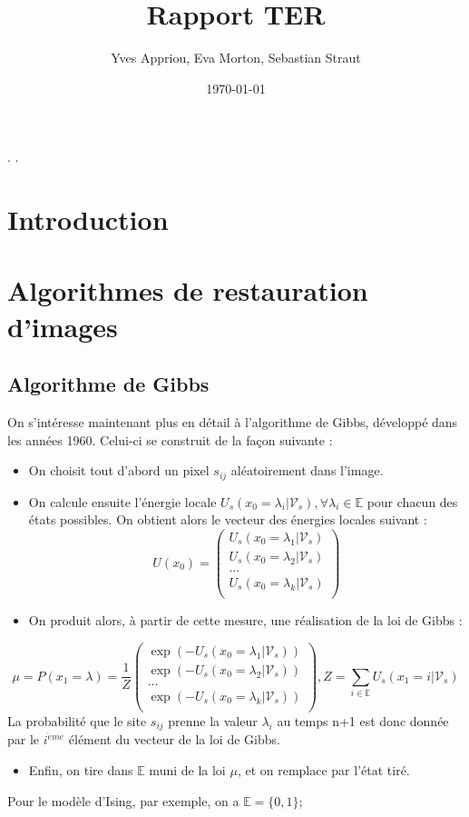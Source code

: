 \documentclass[a4paper, 12pt]{article}
\title{Rapport TER}
\author{Yves Appriou, Eva Morton, Sebastian Straut}
\date{\today}
\begin{document}
\maketitle

\tableofcontents.
\newpage.
\section{Introduction}
\section{Algorithmes de restauration d'images}
\subsection[Algorithme de Gibbs]{Algorithme de Gibbs}
On s'intéresse maintenant plus en détail à l'algorithme de Gibbs, développé dans les années 1960. Celui-ci se construit de la façon suivante : 
\begin{itemize}
\item On choisit tout d'abord un pixel $s_{ij} $ aléatoirement dans l'image.
\item On calcule ensuite l'énergie locale $U_s(x_0=\lambda_i| \mathcal{V}_s), \forall \lambda_i \in \mathbb{E}  $ pour chacun des états possibles. On obtient alors le vecteur des énergies locales suivant : 
\[
  U(x_0) = \left(
          \begin{array}{ll}
            U_s(x_0=\lambda_1| \mathcal{V}_s) \\
            U_s(x_0=\lambda_2| \mathcal{V}_s) \\
            ...\\
            U_s(x_0=\lambda_k| \mathcal{V}_s) \\
          \end{array}
        \right)
\]
\item On produit alors, à partir de cette mesure, une réalisation de la loi de Gibbs : 
\end{itemize}
\[
  \mu = P(x_1 = \lambda) = \frac{1}{Z} \left(
          \begin{array}{ll}
            \exp(-U_s(x_0=\lambda_1| \mathcal{V}_s)) \\
            \exp(-U_s(x_0=\lambda_2| \mathcal{V}_s)) \\
            ...\\
            \exp(-U_s(x_0=\lambda_k| \mathcal{V}_s)) \\
          \end{array}
        \right)
        , Z= \sum_{i\in \mathbb{E}} {U_s(x_1=i | \mathcal{V}_s)}
\]
La probabilité que le site $s_{ij}$ prenne la valeur $\lambda_i$ au temps n+1 est donc donnée par le $i^{\grave{e}me}$ élément du vecteur de la loi de Gibbs.
\begin{itemize}
\item Enfin, on tire dans $\mathbb{E}$ muni de la loi $\mu$, et on remplace par l'état tiré.
\end{itemize}
Pour le modèle d'Ising, par exemple, on a $\mathbb{E} =\{0,1\}$;
\end{document}
